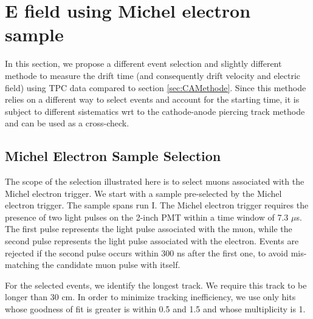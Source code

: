 \section{E field using Michel electron sample}\label{sec:michelEl}
In this section, we propose a different event selection and slightly different methode to measure the drift time (and consequently drift velocity and electric field) using TPC data compared to section \ref{sec:CAMethode}.
Since this methode relies on a different way to select events and account for the starting time, it is subject to different sistematics wrt to the cathode-anode piercing track methode and can be used as a cross-check.

\subsection{Michel Electron Sample Selection}\label{sec:SampleSelectionME}
The scope of the selection illustrated here is to select muons associated with the Michel electron trigger. 
We start with a sample pre-selected by the Michel electron trigger. The sample spans run I. The Michel electron trigger requires the presence of two light pulses on the 2-inch PMT within a time window of 7.3 $\mu$s. The first pulse represents the light pulse associated with the muon, while the second pulse  represents the light pulse associated with the electron. Events are rejected if the second pulse occurs within 300 ns  after the first one, to avoid mis-matching the candidate muon pulse with itself.

For the selected events, we identify the longest track. We require this track to be longer than 30 cm. In order to minimize tracking inefficiency, we use only hits whose goodness of fit is greater is within 0.5 and 1.5 and whose multiplicity is 1.



